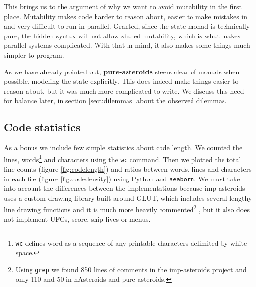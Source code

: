 \documentclass[
  digital, %
  color,   %
  table,   %
  oneside, %
  lof,     %
  lot,     %
]{fithesis3}
\newcommand{\packagename}{\texttt}
\begin{document}
{This brings us to the argument of why we want to avoid mutability in the first place.
Mutability makes code harder to reason about, easier to make mistakes in and
very difficult to run in parallel. Granted, since the state monad is technically
pure, the hidden syntax will not allow shared mutability,
which is what makes parallel systems complicated.
With that in mind, it also makes some things much simpler to program.

As we have already pointed out, \textbf{pure-asteroids} steers clear of monads when possible,
modeling the state explicitly. This does indeed make things easier to reason about,
but it was much more complicated to write.
We discuss this need for balance later, in section \ref{sect:dilemmas} about the observed dilemmas.



\subsection{Code statistics}
\label{sect:codestats}

As a bonus we include few simple statistics about code length.
We counted the lines, words\footnote{
\texttt{wc} defines word
as a sequence of any printable characters delimited by white space.
}
and characters using the \texttt{wc} command.
Then we plotted the total line counts (figure \ref{fig:codelength}) and
ratios between words, lines and characters in each file (figure \ref{fig:codedensity})
using Python and \packagename{seaborn}. We must take into account the differences between
the implementations because imp-asteroids uses a custom drawing library
built around GLUT, which includes several lengthy line drawing functions and
it is much more heavily commented\footnote{
Using \texttt{grep} we found 850 lines of comments in the imp-asteroids project
and only 110 and 50 in hAsteroids and pure-asteroids.
}
, but it also does not implement UFOs, score, ship lives or menus.

}
\end{document}
